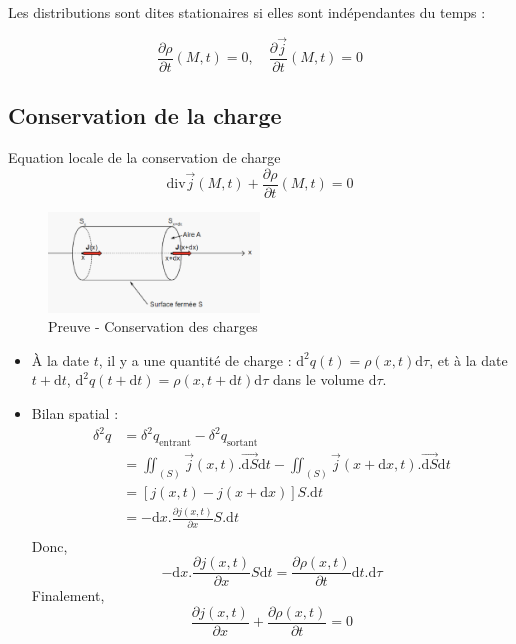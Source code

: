Les distributions sont dites stationaires si elles sont indépendantes du temps : 

\begin{equation}
  \frac{\partial \rho}{\partial t} (M,t) = 0 ,\quad \frac{\partial \overrightarrow{j}}{\partial t} (M, t)= 0
\end{equation}
\subsection{Conservation de la charge}

\begin{Prop}{Equation locale de la conservation de charge}{}
  \[
    \mathrm{div} \overrightarrow{j}(M,t) + \frac{\partial \rho}{\partial t} (M,t) = 0
  \]
\end{Prop}

\begin{myproof}{}{}
  \begin{figure}[H] %
    \centering
    \includegraphics[width=0.5\textwidth]{./assets/Preuve - Conservation des charges.png}
    \caption{Preuve - Conservation des charges}
    \label{fig:Preuve - Conservation des charges}
  \end{figure}

  
\begin{itemize}

    \item À la date $t$, il y a une quantité de charge : $\mathrm{d}^2q(t) = \rho(x,t) \mathrm{d} \tau$, et à la date $t + \mathrm{d}t$, $\mathrm{d}^2q(t + \mathrm{d}t ) = \rho (x, t+ \mathrm{d}t) \mathrm{d}\tau$ dans le volume $\mathrm{d}\tau$.

    \item Bilan spatial :
      \begin{align*}
        \delta ^2 q &= \delta ^2 q _\text{entrant} - \delta ^2 q_\text{sortant} \\
                    &= \iint _{(S)} \overrightarrow{j}(x,t) . \overrightarrow{\mathrm{d}S} \mathrm{d}t  - \iint _{(S)} \overrightarrow{j}(x+ \mathrm{d}x,t) . \overrightarrow{\mathrm{d}S} \mathrm{d}t \\
                    &= [j(x,t) - j(x+ \mathrm{d}x)] S. \mathrm{d}t \\
                    &= - \mathrm{d}x. \frac{\partial j(x,t)}{\partial x}  S. \mathrm{d}t \\
      \end{align*}
      Donc, 
      \[
        - \mathrm{d}x . \frac{\partial j(x,t)}{\partial x} S \mathrm{d} t = \frac{\partial \rho(x,t)}{\partial t} \mathrm{d}t . \mathrm{d} \tau
      \]
      Finalement, 
      \[
        \frac{\partial j(x,t)}{\partial x}  + \frac{\partial \rho(x,t)}{\partial t}  = 0
      \]
\end{itemize}
\end{myproof}

